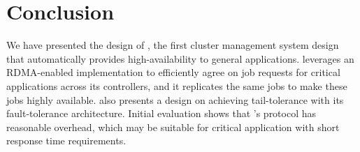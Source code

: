 \section{Conclusion} \label{sec:conclusion}

We have presented the design of \xxx, the first cluster management system 
design that automatically provides high-availability to general applications. 
\xxx leverages an RDMA-enabled \paxos implementation to efficiently agree on 
job requests for critical applications across its controllers, and it 
replicates the same jobs to make these jobs highly available. \xxx also 
presents a design on achieving tail-tolerance with its fault-tolerance 
architecture. Initial evaluation shows that \xxx's protocol has reasonable 
overhead, which may be suitable for critical application with short response 
time requirements. 

